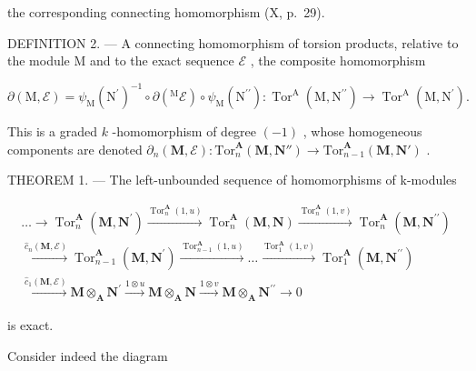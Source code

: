 the corresponding connecting homomorphism (X, p.~29).

DEFINITION 2. --- A connecting homomorphism of torsion products, relative to the module M and to the exact sequence \(\mathcal{E}\) , the composite homomorphism

\[
\partial (\mathrm{M}, \mathcal {E}) = \psi_ {\mathrm{M}} \left(\mathrm{N} ^ {\prime}\right) ^ {- 1} \circ \partial \left(^ {\mathrm{M}} \mathcal {E}\right) \circ \psi_ {\mathrm{M}} \left(\mathrm{N} ^ {\prime \prime}\right): \operatorname{Tor} ^ {\mathrm{A}} \left(\mathrm{M}, \mathrm{N} ^ {\prime \prime}\right)\rightarrow \operatorname{Tor} ^ {\mathrm{A}} \left(\mathrm{M}, \mathrm{N} ^ {\prime}\right).
\]

This is a graded \(k\) -homomorphism of degree \((-1)\) , whose homogeneous components are denoted \(\partial_n(\mathbf{M}, \mathcal{E}) : \mathrm{Tor}_n^{\mathbf{A}}(\mathbf{M}, \mathbf{N}'') \to \mathrm{Tor}_{n-1}^{\mathbf{A}}(\mathbf{M}, \mathbf{N}')\) .

THEOREM 1. --- The left-unbounded sequence of homomorphisms of k-modules

\[
\begin{array}{l} \dots \longrightarrow \operatorname{Tor} _ {n} ^ {\mathbf {A}} (\mathbf {M}, \mathbf {N} ^ {\prime}) \xrightarrow {\operatorname{Tor} _ {n} ^ {\mathbf {A}} (1 , u)} \operatorname{Tor} _ {n} ^ {\mathbf {A}} (\mathbf {M}, \mathbf {N}) \xrightarrow {\operatorname{Tor} _ {n} ^ {\mathbf {A}} (1 , v)} \operatorname{Tor} _ {n} ^ {\mathbf {A}} (\mathbf {M}, \mathbf {N} ^ {\prime \prime}) \\ \xrightarrow {\hat {c} _ {n} (\mathbf {M} , \mathcal {E})} \operatorname{Tor} _ {n - 1} ^ {\mathbf {A}} (\mathbf {M}, \mathbf {N} ^ {\prime}) \xrightarrow {\operatorname{Tor} _ {n - 1} ^ {\mathbf {A}} (1 , u)} \dots \xrightarrow {\operatorname{Tor} _ {1} ^ {\mathbf {A}} (1 , v)} \operatorname{Tor} _ {1} ^ {\mathbf {A}} (\mathbf {M}, \mathbf {N} ^ {\prime \prime}) \\ \xrightarrow {\hat {c} _ {1} (\mathbf {M} , \mathcal {E})} \mathbf {M} \otimes_ {\mathbf {A}} \mathbf {N} ^ {\prime} \xrightarrow {1 \otimes u} \mathbf {M} \otimes_ {\mathbf {A}} \mathbf {N} \xrightarrow {1 \otimes v} \mathbf {M} \otimes_ {\mathbf {A}} \mathbf {N} ^ {\prime \prime} \longrightarrow 0 \end{array}
\]

is exact.

Consider indeed the diagram

